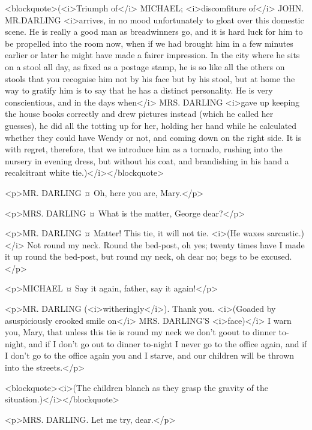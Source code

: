 <blockquote>(<i>Triumph of</i> MICHAEL; <i>discomfiture of</i> JOHN. MR.DARLING <i>arrives, in no mood unfortunately to gloat over this domestic scene. He is really a good man as breadwinners go, and it is hard luck for him to be propelled into the room now, when if we had brought him in a few minutes earlier or later he might have made a fairer impression. In the city where he sits on a stool all day, as fixed as a postage stamp, he is so like all the others on stools that you recognise him not by his face but by his stool, but at home the way to gratify him is to say that he has a distinct personality. He is very conscientious, and in the days when</i> MRS. DARLING <i>gave up keeping the house books correctly and drew pictures instead (which he called her guesses), he did all the totting up for her, holding her hand while he calculated whether they could have Wendy or not, and coming down on the right side. It is with regret, therefore, that we introduce him as a tornado, rushing into the nursery in evening dress, but without his coat, and brandishing in his hand a recalcitrant white tie.)</i></blockquote>

<p>MR. DARLING ¤
Oh, here you are, Mary.</p>

<p>MRS. DARLING ¤
What is the matter, George dear?</p>

<p>MR. DARLING ¤
Matter! This tie, it will not tie. <i>(He waxes sarcastic.)</i> Not round my neck. Round the bed-post, oh yes; twenty times have I made it up round the bed-post, but round my neck, oh dear no; begs to be excused.</p>

<p>MICHAEL ¤
Say it again, father, say it again!</p>

<p>MR. DARLING (<i>witheringly</i>). Thank you. <i>(Goaded by asuspiciously crooked smile on</i> MRS. DARLING'S <i>face)</i> I warn you, Mary, that unless this tie is round my neck we don't goout to dinner to-night, and if I don't go out to dinner to-night I never go to the office again, and if I don't go to the office again you and I starve, and our children will be thrown into the streets.</p>

<blockquote><i>(The children blanch as they grasp the gravity of the situation.)</i></blockquote>

<p>MRS. DARLING. Let me try, dear.</p>

